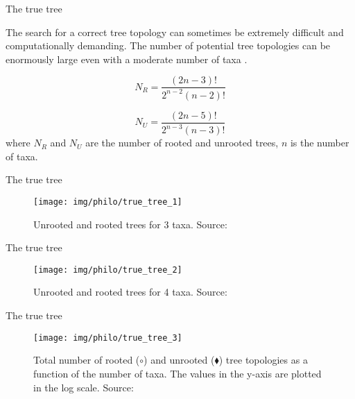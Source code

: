 \documentclass[10pt]{beamer}
\newcommand{\1}{
	\setbeamertemplate{background}{
		\texttt{[image: img/1]}
		\tikz[overlay] \fill[fill opacity=0.75,fill=white] (0,0) rectangle (-\paperwidth,\paperheight);
	}
}
\begin{document}
\begin{frame}{The true tree}{}
	\begin{block}{}
		The	search for a correct tree topology can sometimes be extremely difficult and computationally demanding. The number of potential tree topologies can be enormously large even with a moderate number of taxa \cite{xiong2006essential}.		
	\end{block}

	\begin{equation}
		N_R = \frac{( 2n - 3)! }{ 2^{n-2} (n-2)!}
	\end{equation}
	
	\begin{equation}
	N_U = \frac{( 2n - 5)! }{ 2^{n-3} (n-3)!}
	\end{equation}
	where $N_R$ and $N_U$ are the number of rooted and unrooted trees, $n$ is the number of taxa.

\end{frame}

\begin{frame}{The true tree}{}
	\begin{figure}
		\texttt{[image: img/philo/true\_tree\_1]}
		\caption{Unrooted and rooted trees for 3 taxa. Source: \cite{xiong2006essential}}			
	\end{figure}	
\end{frame}

\begin{frame}{The true tree}{}
	\begin{figure}
		\texttt{[image: img/philo/true\_tree\_2]}
		\caption{Unrooted and rooted trees for 4 taxa. Source: \cite{xiong2006essential}}			
	\end{figure}	
\end{frame}

\begin{frame}{The true tree}{}
	\begin{figure}
		\texttt{[image: img/philo/true\_tree\_3]}
		\caption{Total number of rooted ($\circ$) and unrooted ($\blacklozenge$) tree topologies as a function of the number	of taxa. The values in the y-axis are plotted in the log scale.
			Source: \cite{xiong2006essential}}			
	\end{figure}	
\end{frame}
\end{document}
